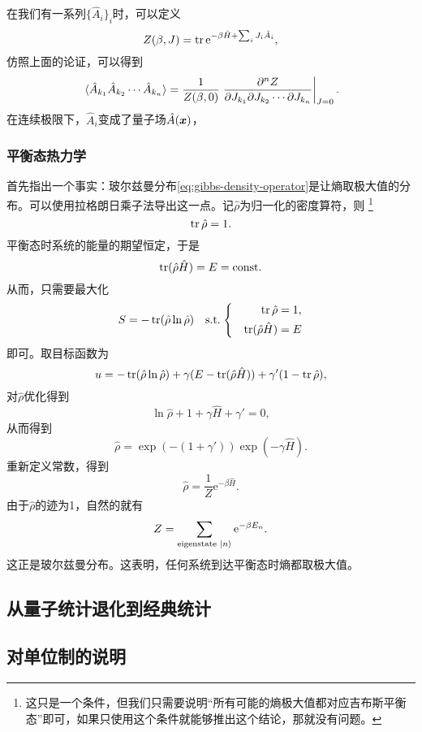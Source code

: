 \documentclass[hyperref, UTF8, a4paper]{ctexart}
\newcommand*{\ee}{\mathrm{e}}
\newcommand*{\const}{\mathrm{const}}
\newenvironment{bigcase}{\left\{\quad\begin{aligned}}{\end{aligned}\right.}
\begin{document}
在我们有一系列$\{\hat{A}_i\}_i$时，可以定义
\begin{equation}
    Z(\beta, J) = \trace \ee^{-\beta \hat{H} + \sum_i J_i \hat{A}_i },
\end{equation}
仿照上面的论证，可以得到
\begin{equation}
    \expval*{\hat{A}_{k_1} \hat{A}_{k_2} \cdots \hat{A}_{k_n}} = \frac{1}{Z(\beta,0)} \eval{\frac{\partial^n Z}{\partial J_{k_1} \partial J_{k_2} \cdots \partial J_{k_n}}}_{J=0}.
\end{equation}
在连续极限下，$\hat{A}_i$变成了量子场$\hat{A}(\vb*{x})$，

\subsubsection{平衡态热力学}

首先指出一个事实：玻尔兹曼分布\eqref{eq:gibbs-density-operator}是让熵取极大值的分布。可以使用拉格朗日乘子法导出这一点。记$\hat{\rho}$为归一化的密度算符，则%
\footnote{这只是一个条件，但我们只需要说明“所有可能的熵极大值都对应吉布斯平衡态”即可，如果只使用这个条件就能够推出这个结论，那就没有问题。}
\[
    \trace \hat{\rho} = 1.
\]
平衡态时系统的能量的期望恒定，于是
\[
    \trace (\hat{\rho} \hat{H}) = E = \const.
\]
从而，只需要最大化
\[
    S = - \trace (\hat{\rho} \ln \hat{\rho}) \quad \text{s.t.} \; \begin{bigcase}
        \trace \hat{\rho} &= 1, \\
        \trace (\hat{\rho} \hat{H}) &= E
    \end{bigcase}
\]
即可。取目标函数为
\[
    u = - \trace (\hat{\rho} \ln \hat{\rho}) + \gamma (E - \trace (\hat{\rho} \hat{H})) + \gamma' (1 - \trace \hat{\rho}),
\]
对$\hat{\rho}$优化得到
\[
    \ln \hat{\rho} + 1 + \gamma \hat{H} + \gamma' = 0,
\]
从而得到
\[
    \hat{\rho} = \exp (-(1+\gamma')) \exp ( - \gamma \hat{H}).
\]
重新定义常数，得到
\[
    \hat{\rho} = \frac{1}{Z} \ee^{-\beta \hat{H}}.
\]
由于$\hat{\rho}$的迹为1，自然的就有
\[
    Z = \sum_\text{eigenstate $\ket{n}$} \ee^{-\beta E_n}.
\]
这正是玻尔兹曼分布。这表明，任何系统到达平衡态时熵都取极大值。

\subsection{从量子统计退化到经典统计}

\subsection{对单位制的说明}

\end{document}
